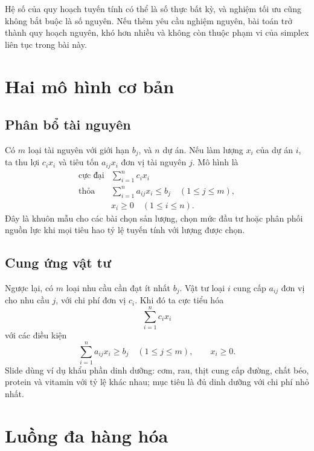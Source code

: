 \documentclass[11pt]{article}
\begin{document}
Hệ số của quy hoạch tuyến tính có thể là số thực bất kỳ, và nghiệm tối ưu
cũng không bắt buộc là số nguyên. Nếu thêm yêu cầu nghiệm nguyên, bài toán
trở thành quy hoạch nguyên, khó hơn nhiều và không còn thuộc phạm vi của
simplex liên tục trong bài này.

\section{Hai mô hình cơ bản}

\subsection{Phân bổ tài nguyên}

Có \(m\) loại tài nguyên với giới hạn \(b_j\), và \(n\) dự án. Nếu làm lượng
\(x_i\) của dự án \(i\), ta thu lợi \(c_ix_i\) và tiêu tốn \(a_{ij}x_i\) đơn
vị tài nguyên \(j\). Mô hình là
\[
\begin{array}{ll}
\text{cực đại} & \displaystyle\sum_{i=1}^{n} c_ix_i\\
\text{thỏa} & \displaystyle\sum_{i=1}^{n} a_{ij}x_i\le b_j
              \quad (1\le j\le m),\\
& x_i\ge 0\quad (1\le i\le n).
\end{array}
\]
Đây là khuôn mẫu cho các bài chọn sản lượng, chọn mức đầu tư hoặc phân phối
nguồn lực khi mọi tiêu hao tỷ lệ tuyến tính với lượng được chọn.

\subsection{Cung ứng vật tư}

Ngược lại, có \(m\) loại nhu cầu cần đạt ít nhất \(b_j\). Vật tư loại \(i\)
cung cấp \(a_{ij}\) đơn vị cho nhu cầu \(j\), với chi phí đơn vị \(c_i\). Khi
đó ta cực tiểu hóa
\[
  \sum_{i=1}^{n} c_ix_i
\]
với các điều kiện
\[
  \sum_{i=1}^{n} a_{ij}x_i\ge b_j \quad (1\le j\le m),\qquad
  x_i\ge 0.
\]
Slide dùng ví dụ khẩu phần dinh dưỡng: cơm, rau, thịt cung cấp đường, chất
béo, protein và vitamin với tỷ lệ khác nhau; mục tiêu là đủ dinh dưỡng với
chi phí nhỏ nhất.

\section{Luồng đa hàng hóa}
\end{document}
